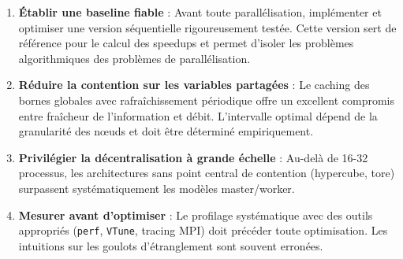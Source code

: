 \documentclass[12pt,a4paper,twoside]{report}
\begin{document}
\begin{enumerate}
    \item \textbf{Établir une baseline fiable} : Avant toute parallélisation, implémenter et optimiser une version séquentielle rigoureusement testée. Cette version sert de référence pour le calcul des speedups et permet d'isoler les problèmes algorithmiques des problèmes de parallélisation.

    \item \textbf{Réduire la contention sur les variables partagées} : Le caching des bornes globales avec rafraîchissement périodique offre un excellent compromis entre fraîcheur de l'information et débit. L'intervalle optimal dépend de la granularité des nœuds et doit être déterminé empiriquement.

    \item \textbf{Privilégier la décentralisation à grande échelle} : Au-delà de 16-32 processus, les architectures sans point central de contention (hypercube, tore) surpassent systématiquement les modèles master/worker.

    \item \textbf{Mesurer avant d'optimiser} : Le profilage systématique avec des outils appropriés (\texttt{perf}, \texttt{VTune}, tracing MPI) doit précéder toute optimisation. Les intuitions sur les goulots d'étranglement sont souvent erronées.
\end{enumerate}

\end{document}
